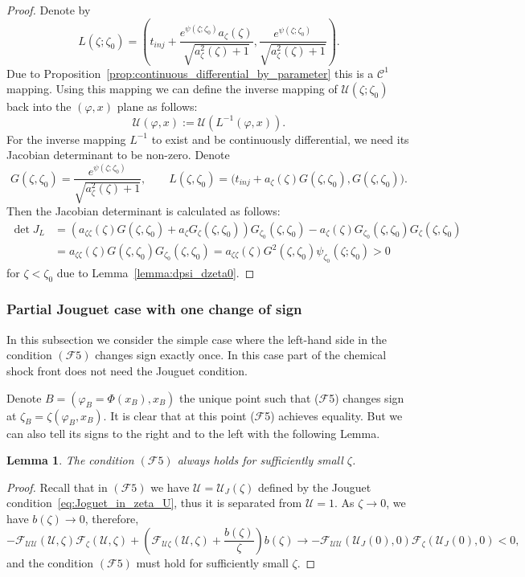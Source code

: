 \documentclass[12pt]{article}
\newtheorem{lemma}{Lemma}
\theoremstyle{definition}
\begin{document}
\begin{proof}
Denote by
\[
L(\zeta; \zeta_0) = \left(t_{inj} + \frac{e^{\psi(\zeta; \zeta_0)}a_\zeta(\zeta)}{\sqrt{a_\zeta^2(\zeta) + 1}}, \frac{e^{\psi(\zeta; \zeta_0)}}{\sqrt{a_\zeta^2(\zeta) + 1}}\right).
\]
Due to Proposition~\ref{prop:continuous_differential_by_parameter} this is a $\mathcal C^1$ mapping. Using this mapping we can define the inverse mapping of $\mathcal U(\zeta; \zeta_0)$ back into the $(\varphi, x)$ plane as follows:
\[
\mathcal U(\varphi, x) := \mathcal U(L^{-1}(\varphi, x)).
\]
For the inverse mapping $L^{-1}$ to exist and be continuously differential, we need its Jacobian determinant to be non-zero. Denote
\[
G(\zeta, \zeta_0) = \frac{e^{\psi(\zeta; \zeta_0)}}{\sqrt{a_\zeta^2(\zeta) + 1}}, \qquad
L(\zeta, \zeta_0) = \Big(t_{inj} + a_\zeta(\zeta)G(\zeta, \zeta_0), G(\zeta, \zeta_0)\Big).
\]
Then the Jacobian determinant is calculated as follows:
\begin{align*}
\det J_L &= (a_{\zeta\zeta}(\zeta) G(\zeta, \zeta_0) + a_{\zeta} G_\zeta(\zeta, \zeta_0)) G_{\zeta_0}(\zeta, \zeta_0) - a_\zeta(\zeta) G_{\zeta_0}(\zeta, \zeta_0) G_\zeta(\zeta, \zeta_0) \\
{} &= a_{\zeta\zeta}(\zeta) G(\zeta, \zeta_0) G_{\zeta_0}(\zeta, \zeta_0) = a_{\zeta\zeta}(\zeta) G^2(\zeta, \zeta_0) \psi_{\zeta_0}(\zeta; \zeta_0) > 0
\end{align*}
for $\zeta<\zeta_0$ due to Lemma~\ref{lemma:dpsi_dzeta0}.
\end{proof}


\subsubsection{Partial Jouguet case with one change of sign}

In this subsection we consider the simple case where the left-hand side in the condition $(\mathcal F 5)$ changes sign exactly once. In this case part of the chemical shock front does not need the Jouguet condition. 

Denote $B = (\varphi_B = \Phi(x_B), x_B)$ the unique point such that ($\mathcal F$5) changes sign at $\zeta_B = \zeta(\varphi_B, x_B)$. It is clear that at this point ($\mathcal F$5) achieves equality. But we can also tell its signs to the right and to the left with the following Lemma.

\begin{lemma}
The condition $(\mathcal F 5)$ always holds for sufficiently small $\zeta$.
\end{lemma}
\begin{proof}
Recall that in $(\mathcal F 5)$ we have $\mathcal U = \mathcal U_J(\zeta)$ defined by the Jouguet condition~\eqref{eq:Joguet_in_zeta_U}, thus it is separated from $\mathcal U = 1$. As $\zeta \to 0$, we have $b(\zeta) \to 0$, 
therefore,
\[
-\mathcal F_{\mathcal U \mathcal U}(\mathcal U, \zeta)\mathcal F_{\zeta}(\mathcal U, \zeta) + \left(\mathcal F_{\mathcal U \zeta}(\mathcal U, \zeta) + \dfrac{b(\zeta)}{\zeta}\right) b(\zeta) \to -\mathcal F_{\mathcal U \mathcal U}(\mathcal U_J(0), 0)\mathcal F_{\zeta}(\mathcal U_J(0), 0) < 0,
\]
and the condition $(\mathcal F 5)$ must hold for sufficiently small $\zeta$.
\end{proof}
\end{document}
